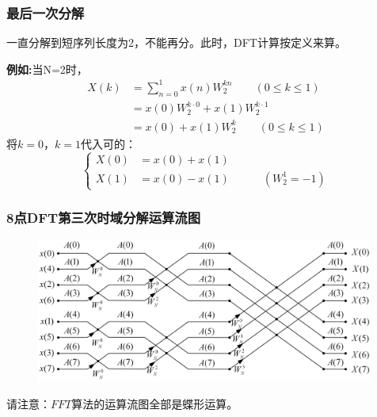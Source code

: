 \documentclass[notheorems,compress,mathserif,table]{beamer}
\begin{document}
\begin{frame}[shrink]\frametitle{最后一次分解}
一直分解到短序列长度为2，不能再分。此时，DFT计算按定义来算。
\par \textbf{例如:}当N=2时，
\begin{equation*}
\begin{split}
X(k)&= \sum_{n=0}^{1}x(n)W_{2}^{kn} \quad\quad(0\leq k\leq1)\\
    &=x(0)W_{2}^{k\cdot 0} + x(1)W_{2}^{k\cdot 1}\\
    &=x(0) + x(1)W_{2}^{k}\quad\quad(0\leq k\leq1)
\end{split}
\end{equation*}
将$k=0$，$k=1$代入可的：
\begin{equation*} \label{eq:2}
\left\{ \begin{aligned}
  X(0) &= x(0) +x(1)\\
  X(1) &= x(0) -x(1) \quad\quad\quad( W_2^1=-1)
\end{aligned} \right.
\end{equation*}
\end{frame}
\begin{frame}[shrink]\frametitle{8点DFT第三次时域分解运算流图}
\begin{figure}[h]
  \centering
  \includegraphics[width=0.99\textwidth]{8dftThird.jpg}
\end{figure}
请注意：$FFT$算法的运算流图全部是蝶形运算。
\end{frame}
\end{document}
